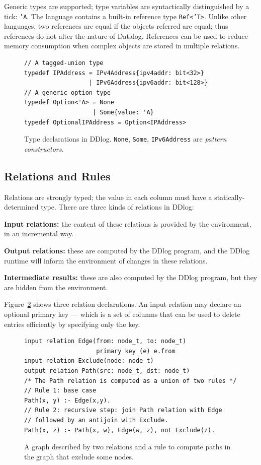 Generic types are supported; type variables are syntactically
distinguished by a tick: \texttt{'A}.  The language
contains a built-in reference type \texttt{Ref<'T>}.  Unlike other
languages, two references are equal if the objects referred are equal;
thus references do not alter the nature of Datalog.  References can be
used to reduce memory consumption when complex objects are stored in
multiple relations.

\begin{figure}[t]
  \footnotesize
\begin{lstlisting}[language=ddlog]
// A tagged-union type
typedef IPAddress = IPv4Address{ipv4addr: bit<32>}
                  | IPv6Address{ipv6addr: bit<128>}
// A generic option type
typedef Option<'A> = None
                   | Some{value: 'A}
typedef OptionalIPAddress = Option<IPAddress>
\end{lstlisting}
\caption{Type declarations in DDlog.  \texttt{None}, \texttt{Some},
\texttt{IPv6Address} are \emph{pattern constructors}.\label{fig:types}}
\end{figure}

\subsection{Relations and Rules}

Relations are strongly typed; the value in each column must have a
statically-determined type.  There are three kinds of relations in
DDlog:

\noindent \textbf{Input relations:} the content of these relations is provided by
the environment, in an incremental way.

\noindent \textbf{Output relations:} these are computed by the DDlog
program, and the DDlog runtime will inform the environment of changes
in these relations.

\noindent \textbf{Intermediate results:} these are also computed by
the DDlog program, but they are hidden from the environment.

Figure~\ref{fig:relations-rules} shows three relation declarations.
An input relation may declare an optional primary key --- which is a
set of columns that can be used to delete entries efficiently by
specifying only the key.

\begin{figure}[t]
  \small
  \begin{lstlisting}[language=ddlog]
input relation Edge(from: node_t, to: node_t)
                    primary key (e) e.from
input relation Exclude(node: node_t)
output relation Path(src: node_t, dst: node_t)
/* The Path relation is computed as a union of two rules */
// Rule 1: base case
Path(x, y) :- Edge(x,y).
// Rule 2: recursive step: join Path relation with Edge
// followed by an antijoin with Exclude.
Path(x, z) :- Path(x, w), Edge(w, z), not Exclude(z).
  \end{lstlisting}
  \caption{A graph described by two relations and a rule to compute
    paths in the graph that exclude some nodes.\label{fig:relations-rules}}
\end{figure}

